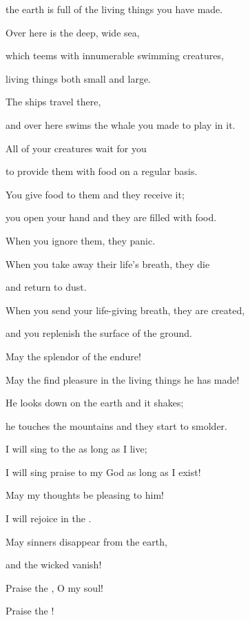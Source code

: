 {\par }{\Q the earth
is full of the living things you have made.
\par }{\Q {}Over here
is the deep,
wide
sea,
\par }{\Q which
teems
with innumerable
swimming creatures,
\par }{\Q living things
both small
and large.
\par }{\Q {}The ships
travel
there,
\par }{\Q and over here swims the whale
you made
to play in it.
\par }{\Q {}All
of your creatures
wait for you
\par }{\Q to provide them
with food
on a regular basis.
\par }{\Q {}You give
food to them and they
receive
it;
\par }{\Q you open
your hand
and they are filled
with food.
\par }{\Q {}When you ignore
them, they panic.
\par }{\Q When you take away
their life’s breath,
they die
\par }{\Q and return
to
dust.
\par }{\Q {}When you send
your life-giving breath,
they are created,
\par }{\Q and you replenish
the surface
of the ground.
\par }{\Q {}May
the splendor
of the {}
endure!

\par }{\Q May the
{}
find pleasure
in the living things he has made!
\par }{\Q {}He looks
down on the earth
and it shakes;
\par }{\Q he touches
the mountains
and they start to smolder.
\par }{\Q {}I will sing
to the
{}
as long as I live;
\par }{\Q I will sing
praise to my God
as long as I exist!
\par }{\Q {}May my thoughts
be pleasing
to him!
\par }{\Q I
will rejoice
in the
{}.
\par }{\Q {}May sinners
disappear from
the earth,
\par }{\Q and the wicked
vanish!
\par }{\Q Praise
the {}, O my soul!
\par }{\Q Praise
the
{}!


}
